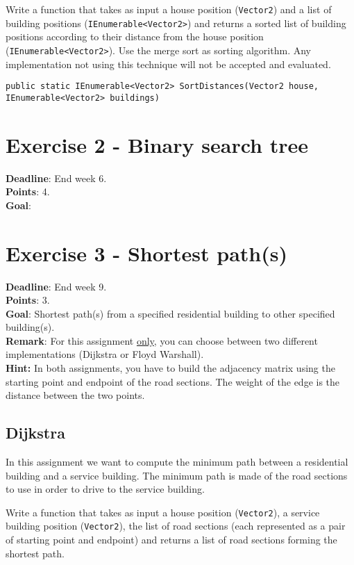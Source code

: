 \documentclass[10pt,a4paper]{article}
\begin{document}
Write a function that takes as input a house position (\texttt{Vector2}) and a list of building positions (\texttt{IEnumerable<Vector2>}) and returns a sorted list of building positions according to their distance from the house position (\texttt{IEnumerable<Vector2>}). Use the merge sort as sorting algorithm. Any implementation not using this technique will not be accepted and evaluated.

\begin{lstlisting}
public static IEnumerable<Vector2> SortDistances(Vector2 house, IEnumerable<Vector2> buildings)
\end{lstlisting}

\section*{Exercise 2 - Binary search tree}
\textbf{Deadline}: End week 6. \\
\textbf{Points}: 4. \\
\textbf{Goal}: \\

\section*{Exercise 3 - Shortest path(s)}
\textbf{Deadline}: End week 9. \\
\textbf{Points}: 3. \\
\textbf{Goal}: Shortest path(s) from a specified residential building to other specified building(s).\\
\textbf{Remark}: For this assignment \underline{only}, you can choose between two different implementations (Dijkstra or Floyd Warshall).\\

\noindent
\textbf{Hint:} In both assignments, you have to build the adjacency matrix using the starting point and endpoint of the road sections. The weight of the edge is the distance between the two points.

\subsection*{Dijkstra}
In this assignment we want to compute the minimum path between a residential building and a service building. The minimum path is made of the road sections to use in order to drive to the service building.

Write a function that takes as input a house position (\texttt{Vector2}), a service building position (\texttt{Vector2}), the list of road sections (each represented as a pair of starting point and endpoint) and returns a list of road sections forming the shortest path.
\end{document}
